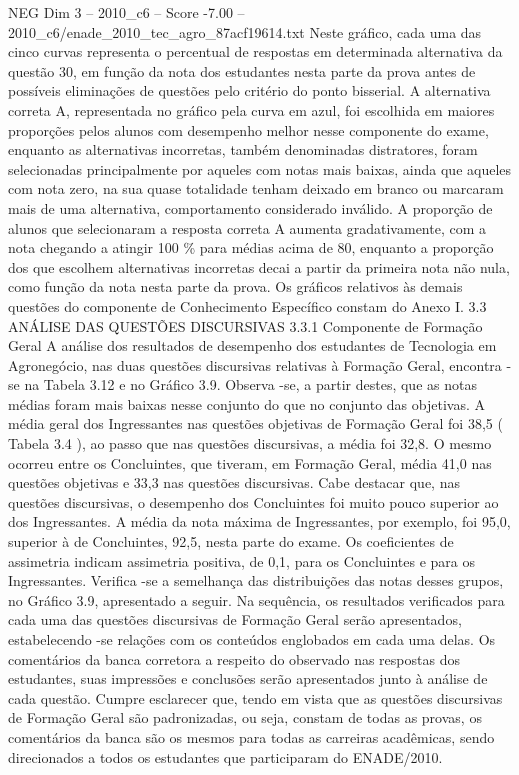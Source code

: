 \begin{textsample}{NEG Dim 3 – 2010\_c6 – Score -7.00 – 2010\_c6/enade\_2010\_tec\_agro\_87acf19614.txt}
Neste gráfico, cada uma das cinco curvas representa o percentual de respostas em determinada alternativa da questão 30, em função da nota dos estudantes nesta parte da prova antes de possíveis eliminações de questões pelo critério do ponto bisserial.
A alternativa correta A, representada no gráfico pela curva em azul, foi escolhida em maiores proporções pelos alunos com desempenho melhor nesse componente do exame, enquanto as alternativas incorretas, também denominadas distratores, foram selecionadas principalmente por aqueles com notas mais baixas, ainda que aqueles com nota zero, na sua quase totalidade tenham deixado em branco ou marcaram mais de uma alternativa, comportamento considerado inválido.
A proporção de alunos que selecionaram a resposta correta A aumenta gradativamente, com a nota chegando a atingir 100 \% para médias acima de 80, enquanto a proporção dos que escolhem alternativas incorretas decai a partir da primeira nota não nula, como função da nota nesta parte da prova.
Os gráficos relativos às demais questões do componente de Conhecimento Específico constam do Anexo I. 3.3 ANÁLISE DAS QUESTÕES DISCURSIVAS 3.3.1 Componente de Formação Geral A análise dos resultados de desempenho dos estudantes de Tecnologia em Agronegócio, nas duas questões discursivas relativas à Formação Geral, encontra -se na Tabela 3.12 e no Gráfico 3.9.
Observa -se, a partir destes, que as notas médias foram mais baixas nesse conjunto do que no conjunto das objetivas.
A média geral dos Ingressantes nas questões objetivas de Formação Geral foi 38,5 ( Tabela 3.4 ), ao passo que nas questões discursivas, a média foi 32,8.
O mesmo ocorreu entre os Concluintes, que tiveram, em Formação Geral, média 41,0 nas questões objetivas e 33,3 nas questões discursivas.
Cabe destacar que, nas questões discursivas, o desempenho dos Concluintes foi muito pouco superior ao dos Ingressantes.
A média da nota máxima de Ingressantes, por exemplo, foi 95,0, superior à de Concluintes, 92,5, nesta parte do exame.
Os coeficientes de assimetria indicam assimetria positiva, de 0,1, para os Concluintes e para os Ingressantes.
Verifica -se a semelhança das distribuições das notas desses grupos, no Gráfico 3.9, apresentado a seguir.
Na sequência, os resultados verificados para cada uma das questões discursivas de Formação Geral serão apresentados, estabelecendo -se relações com os conteúdos englobados em cada uma delas.
Os comentários da banca corretora a respeito do observado nas respostas dos estudantes, suas impressões e conclusões serão apresentados junto à análise de cada questão.
Cumpre esclarecer que, tendo em vista que as questões discursivas de Formação Geral são padronizadas, ou seja, constam de todas as provas, os comentários da banca são os mesmos para todas as carreiras acadêmicas, sendo direcionados a todos os estudantes que participaram do ENADE/2010.

\end{textsample}
